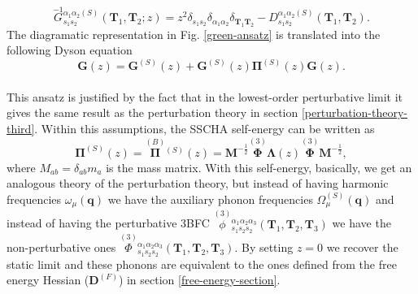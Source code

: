 \begin{equation}
 \overset{-1}{G}{}_{s_{1}s_{2}}^{\alpha_{1}\alpha_{2}(S)}(\mathbf{T}_{1},\mathbf{T}_{2};z)=z^{2}\delta_{s_{1}s_{2}}\delta_{\alpha_{1}\alpha_{2}}\delta_{\mathbf{T}_{1}\mathbf{T}_{2}}-D_{s_{1}s_{2}}^{\alpha_{1}\alpha_{2}(S)}(\mathbf{
 T}_{1},\mathbf{T}_{2}).
\end{equation}
The diagramatic representation in Fig. \ref{green-ansatz} is translated into the following Dyson equation
\begin{equation}
 \mathbf{G}(z)=\mathbf{G}^{(S)}(z)+\mathbf{G}^{(S)}(z)\boldsymbol{\Pi}^{(S)}(z)\mathbf{G}(z).
\end{equation}
\\

This ansatz is justified by the fact that in the lowest-order perturbative limit it gives the same result 
as the perturbation theory in section \ref{perturbation-theory-third}. Within this assumptions, the SSCHA self-energy can be written as\cite{bianco2017second}
\begin{equation}
 \boldsymbol{\Pi}^{(S)}(z)=\overset{(B)}{\boldsymbol{\Pi}}{}^{(S)}(z)=\boldsymbol{M}^{-\frac{1}{2}}\overset{(3)}{\boldsymbol{\Phi}}\boldsymbol{\Lambda}(z)\overset{(3)}{\boldsymbol{\Phi}}\boldsymbol{M}^{-\frac{1}{2}},
\end{equation} 
where $M_{ab}=\delta_{ab}m_{a}$ is the mass matrix. With this self-energy, basically, we get an analogous theory of the perturbation theory, but instead of having harmonic frequencies $\omega_{\mu}(\mathbf{q})$ we 
have the auxiliary phonon frequencies $\Omega^{(S)}_{\mu}(\mathbf{q})$ and instead of having the perturbative 3BFC $\overset{(3)}{\phi}{}_{s_{1}s_{2}s_{2}}^{\alpha_{1}\alpha_{2}\alpha_{3}}(\mathbf{T}_{1},\mathbf{
 T}_{2},\mathbf{T}_{3})$ we have the non-perturbative ones $\overset{(3)}{\Phi}{}_{s_{1}s_{2}s_{2}}^{\alpha_{1}\alpha_{2}\alpha_{3}}(\mathbf{T}_{1},\mathbf{T}_{2},\mathbf{T}_{3})$. By setting $z=0$ we recover the static limit and these 
 phonons are equivalent to the ones defined from the free energy Hessian ($\boldsymbol{D}^{(F)}$) in 
 section \ref{free-energy-section}. \\

